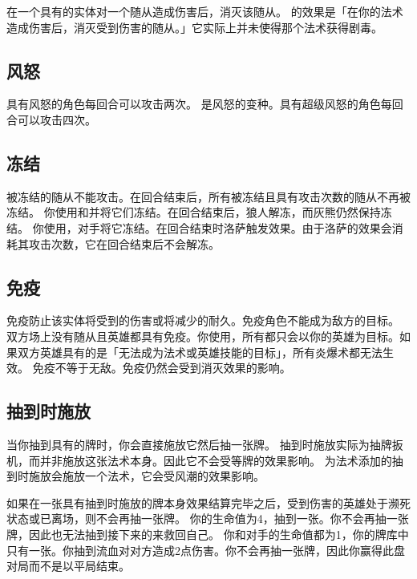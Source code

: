 在一个具有的实体对一个随从造成伤害后，消灭该随从。
\notice {}的效果是「在你的法术造成伤害后，消灭受到伤害的随从。」它实际上并未使得那个法术获得剧毒。

\subsection{风怒}
\label{windfury}

具有风怒的角色每回合可以攻击两次。
\notice {}是风怒的变种。具有超级风怒的角色每回合可以攻击四次。

\subsection{冻结}
\label{freeze}

被冻结的随从不能攻击。在回合结束后，所有被冻结且具有攻击次数的随从不再被冻结。
\example 你使用和并将它们冻结。在回合结束后，狼人解冻，而灰熊仍然保持冻结。
\example 你使用，对手将它冻结。在回合结束时洛萨触发效果。由于洛萨的效果会消耗其攻击次数，它在回合结束后不会解冻。

\subsection{免疫}
\label{immune}

免疫防止该实体将受到的伤害或将减少的耐久。免疫角色不能成为敌方的目标。
\example 双方场上没有随从且英雄都具有免疫。你使用，所有都只会以你的英雄为目标。如果双方英雄具有的是「无法成为法术或英雄技能的目标」，所有炎爆术都无法生效。
\notice 免疫不等于无敌。免疫仍然会受到消灭效果的影响。

\subsection{抽到时施放}
\label{cast-when-drawn}

当你抽到具有的牌时，你会直接施放它然后抽一张牌。
\notice 抽到时施放实际为抽牌扳机，而并非施放这张法术本身。因此它不会受等牌的效果影响。
\exception {}为法术添加的抽到时施放会施放一个法术，它会受风潮的效果影响。

如果在一张具有抽到时施放的牌本身效果结算完毕之后，受到伤害的英雄处于濒死状态或已离场，则不会再抽一张牌。
\example 你的生命值为4，抽到一张。你不会再抽一张牌，因此也无法抽到接下来的来救回自己。
\example 你和对手的生命值都为1，你的牌库中只有一张。你抽到流血对对方造成2点伤害。你不会再抽一张牌，因此你赢得此盘对局而不是以平局结束。


